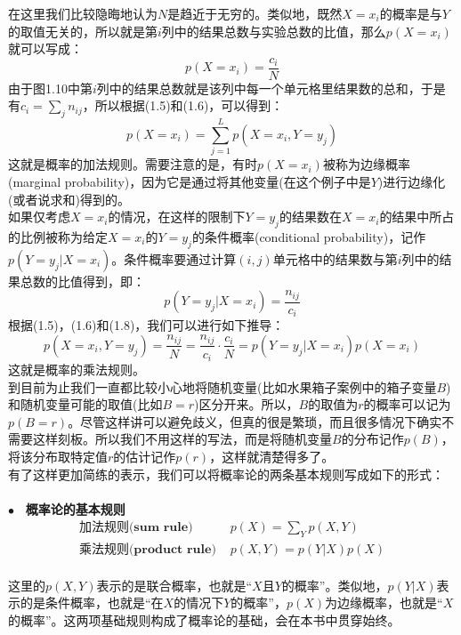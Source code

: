 \documentclass[b5paper]{book}
\numberwithin{equation}{chapter}
\newcommand {\insertline} {\noindent{\color{red} \rule[5pt]{\textwidth}{0.1em}}}
\begin{document}
{	\indent 在这里我们比较隐晦地认为$N$是趋近于无穷的。类似地，既然$X=x_i$的概率是与$Y$的取值无关的，所以就是第$i$列中的结果总数与实验总数的比值，那么$p(X=x_i)$就可以写成：
	\begin{equation}
		p(X=x_i)=\frac{c_i}{N}
	\end{equation}
	\indent 由于图1.10中第$i$列中的结果总数就是该列中每一个单元格里结果数的总和，于是有$c_i=\sum_{j}n_{ij}$，所以根据(1.5)和(1.6)，可以得到：
	\begin{equation}
		p(X=x_i)=\sum_{j=1}^{L} p(X=x_i,Y=y_j)
	\end{equation}
	\indent 这就是概率的加法规则。需要注意的是，有时$p(X=x_i)$被称为边缘概率(marginal probability)，因为它是通过将其他变量(在这个例子中是$Y$)进行边缘化(或者说求和)得到的。\\
	\indent 如果仅考虑$X=x_i$的情况，在这样的限制下$Y=y_j$的结果数在$X=x_i$的结果中所占的比例被称为给定$X=x_i$的$Y=y_j$的条件概率(conditional probability)，记作$p(Y=y_j|X=x_i)$。条件概率要通过计算$(i,j)$单元格中的结果数与第$i$列中的结果总数的比值得到，即：
	\begin{equation}
		p(Y=y_j|X=x_i)=\frac{n_{ij}}{c_i}
	\end{equation}
	\indent 根据(1.5)，(1.6)和(1.8)，我们可以进行如下推导：
	\begin{equation}
		p(X=x_i,Y=y_j) = \frac{n_{ij}}{N}=\frac{n_{ij}}{c_i} \cdot \frac{c_i}{N} = p(Y=y_j|X=x_i)p(X=x_i)
	\end{equation}
	\indent 这就是概率的乘法规则。\\
	\indent 到目前为止我们一直都比较小心地将随机变量(比如水果箱子案例中的箱子变量$B$)和随机变量可能的取值(比如$B=r$)区分开来。所以，$B$的取值为$r$的概率可以记为$p(B=r)$。尽管这样讲可以避免歧义，但真的很是繁琐，而且很多情况下确实不需要这样刻板。所以我们不用这样的写法，而是将随机变量$B$的分布记作$p(B)$，将该分布取特定值$r$的估计记作$p(r)$，这样就清楚得多了。\\
	\indent 有了这样更加简练的表示，我们可以将概率论的两条基本规则写成如下的形式：\\
	\insertline\\
	\color{red} $\bullet$ \textbf{\ 概率论的基本规则}　\color{black}
	\begin{align}
		\textbf{加法规则(sum rule)\ \ \ \ }　&p(X)=\sum_{Y}^{}p(X,Y) \\
		\textbf{乘法规则(product rule)\ \ \ \ } &p(X,Y)=p(Y|X)p(X)
	\end{align}
	\insertline\\
	\indent 这里的$p(X,Y)$表示的是联合概率，也就是“$X$且$Y$的概率”。类似地，$p(Y|X)$表示的是条件概率，也就是“在$X$的情况下$Y$的概率”，$p(X)$为边缘概率，也就是“$X$的概率”。这两项基础规则构成了概率论的基础，会在本书中贯穿始终。\\
}
\end{document}

